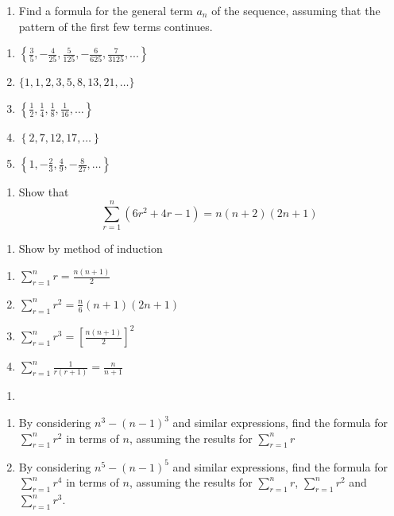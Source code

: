 \documentclass[]{book}
\providecommand{\tightlist}{%
  \setlength{\itemsep}{0pt}\setlength{\parskip}{0pt}}
\begin{document}
\begin{enumerate}
\def\labelenumi{\arabic{enumi}.}
\tightlist
\item
  Find a formula for the general term \(a_{n}\) of the sequence, assuming that the pattern of the first few terms continues.
\end{enumerate}

\begin{enumerate}
\def\labelenumi{(\alph{enumi})}
\tightlist
\item
  \(\left\{\frac{3}{5},-\frac{4}{25}, \frac{5}{125}, -\frac{6}{625}, \frac{7}{3125},...\right\}\)
\item
  \(\{1,1,2,3,5,8,13,21,\dots\}\)
\item
  \(\left\{\frac{1}{2}, \frac{1}{4}, \frac{1}{8}, \frac{1}{16}, \dots \right\}\)
\item
  \(\left\{2,7,12,17, \dots \right\}\)
\item
  \(\left\{1,-\frac{2}{3}, \frac{4}{9} , -\frac{8}{27}, \dots \right\}\)
\end{enumerate}

\begin{enumerate}
\def\labelenumi{\arabic{enumi}.}
\setcounter{enumi}{1}
\tightlist
\item
  Show that
  \[\sum_{r=1}^n(6r^2+4r-1) = n(n+2)(2n+1)\]
\end{enumerate}

\begin{enumerate}
\def\labelenumi{\arabic{enumi}.}
\setcounter{enumi}{2}
\tightlist
\item
  Show by method of induction
\end{enumerate}

\begin{enumerate}
\def\labelenumi{(\alph{enumi})}
\tightlist
\item
  \(\sum_{r=1}^nr=\frac{n(n+1)}{2}\)
\item
  \(\sum_{r=1}^nr^2=\frac{n}{6}(n+1)(2n+1)\)
\item
  \(\sum_{r=1}^nr^3=\left[\frac{n(n+1)}{2}\right]^2\) 
\item
  \(\sum_{r=1}^n\frac{1}{r(r+1)}=\frac{n}{n+1}\) 
\end{enumerate}

\begin{enumerate}
\def\labelenumi{\arabic{enumi}.}
\setcounter{enumi}{3}
\item
\end{enumerate}

\begin{enumerate}
\def\labelenumi{(\alph{enumi})}
\item
  By considering \(n^3 − (n − 1)^3\) and similar expressions, find the formula for \(\sum_{r=1}^nr^2\) in terms of \(n\), assuming the results for
  \(\sum_{r=1}^nr\)
\item
  By considering \(n^5 − (n − 1)^5\) and similar expressions, find the formula for \(\sum_{r=1}^nr^4\) in terms of \(n\), assuming the results for
  \(\sum_{r=1}^nr\), \(\sum_{r=1}^nr^2\) and \(\sum_{r=1}^nr^3.\)
\end{enumerate}
\end{document}
